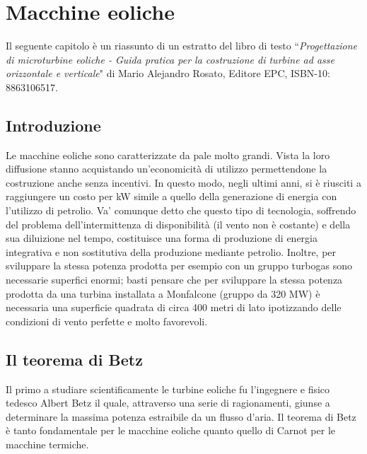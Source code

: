 \chapter{Macchine eoliche}
Il seguente capitolo è un riassunto di un estratto del libro di testo ``\textit{Progettazione di microturbine eoliche - Guida pratica per la costruzione di turbine ad asse orizzontale e verticale}" di Mario Alejandro Rosato, Editore EPC, ISBN-10: 8863106517.
\section{Introduzione}
Le macchine eoliche sono caratterizzate da pale molto grandi. Vista la loro diffusione stanno acquistando un'economicità di utilizzo permettendone la costruzione anche senza incentivi. In questo modo, negli ultimi anni, si è riusciti a raggiungere un costo per kW simile a quello della generazione di energia con l'utilizzo di petrolio. Va' comunque detto che questo tipo di tecnologia, soffrendo del problema dell'intermittenza di disponibilità (il vento non è costante) e della sua diluizione nel tempo, costituisce una forma di produzione di energia integrativa e non sostitutiva della produzione mediante petrolio. Inoltre, per sviluppare la stessa potenza prodotta per esempio con un gruppo turbogas sono necessarie superfici enormi; basti pensare che per sviluppare la stessa potenza prodotta da una turbina installata a Monfalcone (gruppo da 320 MW) è necessaria una superficie quadrata di circa 400 metri di lato ipotizzando delle condizioni di vento perfette e molto favorevoli.
\section{Il teorema di Betz}
Il primo a studiare scientificamente le turbine eoliche fu l'ingegnere e fisico tedesco Albert Betz il quale, attraverso una serie di ragionamenti, giunse a determinare la massima potenza estraibile da un flusso d'aria. Il teorema di Betz è tanto fondamentale per le macchine eoliche quanto quello di Carnot per le macchine termiche. 

